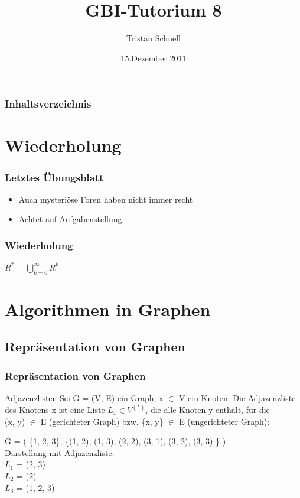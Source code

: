 \documentclass{beamer}
\author{Tristan Schnell}
\title{GBI-Tutorium 8}
\date{15.Dezember 2011}
\begin{document}
\begin {frame}
	\titlepage
\end {frame}

\begin {frame}
	\frametitle {Inhaltsverzeichnis}
	\tableofcontents
\end {frame}

\section{Wiederholung}

\begin{frame}
	\frametitle{Letztes \"Ubungsblatt}
		\begin{itemize}
			\item Auch mysteriöse Foren haben nicht immer recht
			\item Achtet auf Aufgabenstellung
		\end{itemize}
\end{frame}

\begin{frame}
	\frametitle{Wiederholung}
	\begin{center}
		$R^* = \bigcup_{k = 0}^\infty R^k$
	\end{center}
\end{frame}

\section{Algorithmen in Graphen} 
\subsection{Repr\"asentation von Graphen}

\begin{frame}
	\frametitle{Repr\"asentation von Graphen}

	\begin{block}{Adjazenzlisten}
		Sei G = (V, E) ein Graph, x $\in$ V ein Knoten. Die Adjazenzliste des Knotens x ist eine Liste $L_x \in V^{(*)}$, die alle 				Knoten y enth\"alt, f\"ur die \\ (x, y) $\in$ E (gerichteter Graph) bzw. \{x, y\} $\in$ E (ungerichteter Graph):
	\end{block}

	\begin{example}
		G = ( \{1, 2, 3\}, \{(1, 2), (1, 3), (2, 2), (3, 1), (3, 2), (3, 3) \} ) \\
		\parskip 12pt
		Darstellung mit Adjazenzliste: \\
		$L_1$ = (2, 3) \\
		$L_2$ = (2) \\
		$L_3$ = (1, 2, 3)\\
		
	\end{example}
\end{frame}
\end{document}
